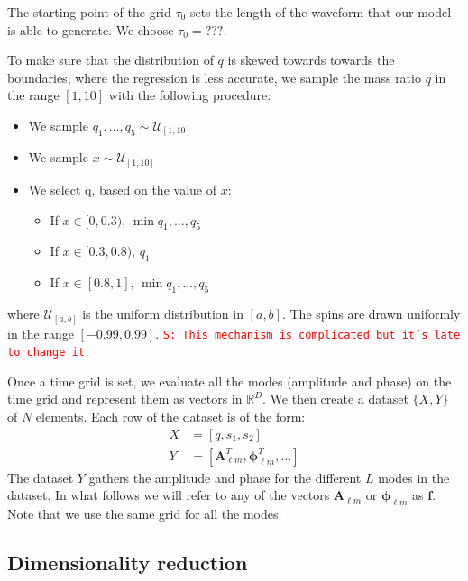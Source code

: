 \documentclass[twocolumn,showpacs,preprintnumbers,nofootinbib,prd,
superscriptaddress,10pt]{revtex4-1}
\newcommand{\R}{\mathbb{R}}
\newcommand{\stefano}[1]{{\textcolor{red}{\texttt{S: #1}} }}
\begin{document}
The starting point of the grid $\tau_0$ sets the length of the waveform that our model is able to generate. We choose $\tau_0 = \text{???}$.

To make sure that the distribution of $q$ is skewed towards towards the boundaries, where the regression is less accurate, we sample the mass ratio $q$ in the range $[1,10]$ with the following procedure:
\begin{itemize}
	\item We sample $q_1, \hdots, q_5 \sim \mathcal{U}_{[1,10]}$
	\item We sample $x \sim \mathcal{U}_{[1,10]}$
	\item We select q, based on the value of $x$:
	\begin{itemize}
		\item If $x \in [0,0.3)$, $\min q_1, \hdots, q_5$
		\item If $x \in [0.3, 0.8)$, $q_1$
		\item If $x \in [0.8, 1]$, $\min q_1, \hdots, q_5$
	\end{itemize}
\end{itemize}
where $\mathcal{U}_{[a,b]}$ is the uniform distribution in $[a,b]$.
The spins are drawn uniformly in the range $[-0.99, 0.99]$.
\stefano{This mechanism is complicated but it's late to change it}

Once a time grid is set, we evaluate all the modes (amplitude and phase) on the time grid and represent them as vectors in $\R^D$.
We then create a dataset $\{X, Y\}$ of $N$ elements. Each row of the dataset is of the form:
\begin{align}
	X &= [q, s_1, s_2] \\
	Y &= [\boldsymbol{A}^T_{\ell m}, \boldsymbol{\phi}^T_{\ell m}, \hdots ] 
\end{align}
%
The dataset $Y$ gathers the amplitude and phase for the different $L$ modes in the dataset.
In what follows we will refer to any of the vectors $\boldsymbol{A}_{\ell m}$ or $\boldsymbol{\phi}_{\ell m}$ as $\boldsymbol{f}$.
Note that we use the same grid for all the modes.

\subsection{Dimensionality reduction}
\label{sec:PCA}
\end{document}
